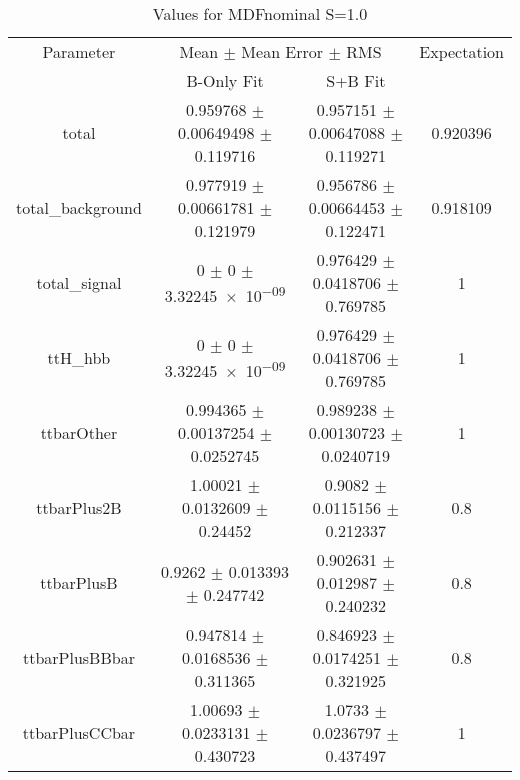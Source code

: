 \begin{table}
\centering
\caption{Values for MDFnominal S=1.0}
\begin{tabular}{cccc}
\toprule
Parameter & \multicolumn{2}{c}{Mean $\pm$ Mean Error $\pm$ RMS} & Expectation\\
 & B-Only Fit & S+B Fit & \\
\midrule
total & \num{0.959768} $\pm$ \num{0.00649498} $\pm$ \num{0.119716} & \num{0.957151} $\pm$ \num{0.00647088} $\pm$ \num{0.119271} & \num{0.920396}\\
total\_background & \num{0.977919} $\pm$ \num{0.00661781} $\pm$ \num{0.121979} & \num{0.956786} $\pm$ \num{0.00664453} $\pm$ \num{0.122471} & \num{0.918109}\\
total\_signal & \num{0} $\pm$ \num{0} $\pm$ \num{3.32245e-09} & \num{0.976429} $\pm$ \num{0.0418706} $\pm$ \num{0.769785} & \num{1}\\
ttH\_hbb & \num{0} $\pm$ \num{0} $\pm$ \num{3.32245e-09} & \num{0.976429} $\pm$ \num{0.0418706} $\pm$ \num{0.769785} & \num{1}\\
ttbarOther & \num{0.994365} $\pm$ \num{0.00137254} $\pm$ \num{0.0252745} & \num{0.989238} $\pm$ \num{0.00130723} $\pm$ \num{0.0240719} & \num{1}\\
ttbarPlus2B & \num{1.00021} $\pm$ \num{0.0132609} $\pm$ \num{0.24452} & \num{0.9082} $\pm$ \num{0.0115156} $\pm$ \num{0.212337} & \num{0.8}\\
ttbarPlusB & \num{0.9262} $\pm$ \num{0.013393} $\pm$ \num{0.247742} & \num{0.902631} $\pm$ \num{0.012987} $\pm$ \num{0.240232} & \num{0.8}\\
ttbarPlusBBbar & \num{0.947814} $\pm$ \num{0.0168536} $\pm$ \num{0.311365} & \num{0.846923} $\pm$ \num{0.0174251} $\pm$ \num{0.321925} & \num{0.8}\\
ttbarPlusCCbar & \num{1.00693} $\pm$ \num{0.0233131} $\pm$ \num{0.430723} & \num{1.0733} $\pm$ \num{0.0236797} $\pm$ \num{0.437497} & \num{1}\\
\bottomrule
\end{tabular}
\end{table}